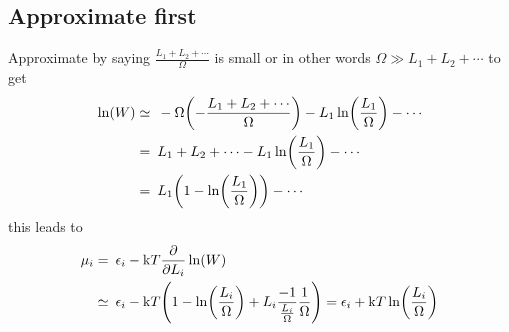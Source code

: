 \documentclass[11pt]{article}
\begin{document}
\subsection{Approximate first}
Approximate by saying $\frac{L_1+L_2+\cdots}{\Omega}$ is small or in other words $\Omega \gg L_1+L_2+\cdots$ to get
\begin{align}
	\ln(W) \simeq & \enspace -\Omega\qty(-\frac{L_1+L_2+\cdots}{\Omega}) -L_1\ln(\frac{L_1}{\Omega}) -\cdots \\
	=             & \enspace L_1+L_2+\cdots -L_1\ln(\frac{L_1}{\Omega}) -\cdots                              \\
	=             & \enspace L_1\qty(1-\ln(\frac{L_1}{\Omega})) -\cdots                                      \\
\end{align}
this leads to
\begin{align}
	\mu_i = & \enspace \epsilon_i - \si{k}T \pdv{L_i} \ln(W)                                                                                                              \\
	\simeq  & \enspace \epsilon_i - \si{k}T\qty(1-\ln(\frac{L_i}{\Omega})+L_i\frac{-1}{\frac{L_i}{\Omega}}\frac{1}{\Omega}) = \epsilon_i + \si{k}T\ln(\frac{L_i}{\Omega})
\end{align}
\end{document}
